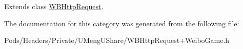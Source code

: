 Extends class \mbox{\hyperlink{interface_w_b_http_request_aebf781874099f199819a90a1f83f06d5}{W\+B\+Http\+Request}}.



The documentation for this category was generated from the following file\+:\begin{DoxyCompactItemize}
\item 
Pods/\+Headers/\+Private/\+U\+Meng\+U\+Share/W\+B\+Http\+Request+\+Weibo\+Game.\+h\end{DoxyCompactItemize}
